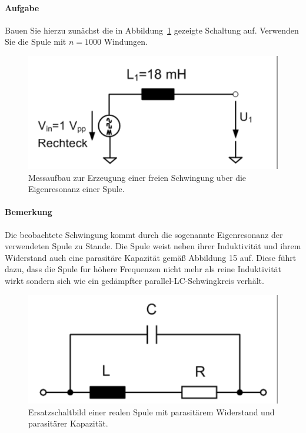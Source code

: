 \documentclass[10pt]{report}
\begin{document}
        \paragraph{Aufgabe}
        Bauen Sie hierzu zunächst die in Abbildung~\ref{fig:abb14} gezeigte Schaltung auf. Verwenden
        Sie die Spule mit $n = 1000$ Windungen.
        \begin{center}
            \begin{figure}[H]
                \includegraphics[width=\textwidth]{Abbildung14.png}
                \caption{Messaufbau zur Erzeugung einer freien Schwingung uber die Eigenresonanz einer Spule.}
                \label{fig:abb14}
            \end{figure}
        \end{center}

        \paragraph{Bemerkung}
        Die beobachtete Schwingung kommt durch die sogenannte Eigenresonanz der verwendeten
        Spule zu Stande. Die Spule weist neben ihrer Induktivität und ihrem
        Widerstand auch eine parasitäre Kapazität gemäß Abbildung 15 auf. Diese führt
        dazu, dass die Spule fur höhere Frequenzen nicht mehr als reine Induktivität wirkt
        sondern sich wie ein gedämpfter parallel-LC-Schwingkreis verhält.

        \begin{center}
            \begin{figure}[H]
                \includegraphics[width=\textwidth]{Abbildung15.png}
                \caption{Ersatzschaltbild einer realen Spule mit parasitärem Widerstand und parasitärer Kapazität.}
                \label{fig:abb15}
            \end{figure}
        \end{center}
\end{document}
